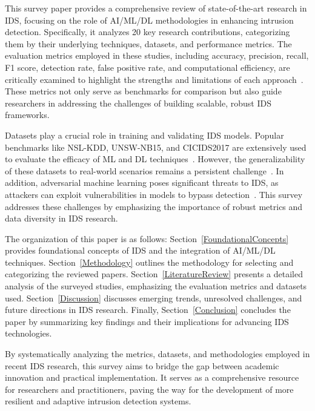 This survey paper provides a comprehensive review of state-of-the-art research in IDS, focusing on the role of AI/ML/DL methodologies in enhancing intrusion detection. Specifically, it analyzes 20 key research contributions, categorizing them by their underlying techniques, datasets, and performance metrics. The evaluation metrics employed in these studies, including accuracy, precision, recall, F1 score, detection rate, false positive rate, and computational efficiency, are critically examined to highlight the strengths and limitations of each approach~\cite{Jayalaxmi2022}. These metrics not only serve as benchmarks for comparison but also guide researchers in addressing the challenges of building scalable, robust IDS frameworks.

Datasets play a crucial role in training and validating IDS models. Popular benchmarks like NSL-KDD, UNSW-NB15, and CICIDS2017 are extensively used to evaluate the efficacy of ML and DL techniques~\cite{Gutierrez2023}. However, the generalizability of these datasets to real-world scenarios remains a persistent challenge~\cite{Sadia2024}. In addition, adversarial machine learning poses significant threats to IDS, as attackers can exploit vulnerabilities in models to bypass detection~\cite{Alotaibi2023AML}. This survey addresses these challenges by emphasizing the importance of robust metrics and data diversity in IDS research.

The organization of this paper is as follows: Section~\ref{FoundationalConcepts} provides foundational concepts of IDS and the integration of AI/ML/DL techniques. Section~\ref{Methodology} outlines the methodology for selecting and categorizing the reviewed papers. Section~\ref{LiteratureReview} presents a detailed analysis of the surveyed studies, emphasizing the evaluation metrics and datasets used. Section~\ref{Discussion} discusses emerging trends, unresolved challenges, and future directions in IDS research. Finally, Section~\ref{Conclusion} concludes the paper by summarizing key findings and their implications for advancing IDS technologies.

By systematically analyzing the metrics, datasets, and methodologies employed in recent IDS research, this survey aims to bridge the gap between academic innovation and practical implementation. It serves as a comprehensive resource for researchers and practitioners, paving the way for the development of more resilient and adaptive intrusion detection systems.






